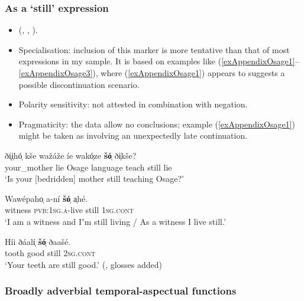\subsubsection{As a \lq{}still\rq{ }expression}
\begin{itemize}
	\item \citeauthor{Quintero1997} (\citeyear[305]{Quintero1997}, \citeyear[307–308, 410, 446]{Quintero2004}, \citeyear[208]{QuinteroDictionary}).
	\item Specialisation: inclusion of this marker is more tentative than that of most expressions in my sample. It is  based on examples like (\ref{exAppendixOsage1}–\ref{exAppendixOsage3}), where (\ref{exAppendixOsage1}) appears to suggests a possible discontinuation scenario.
	\item Polarity sensitivity: not attested in combination with negation.
	\item Pragmaticity: the data allow no conclusions; example (\ref{exAppendixOsage1}) might be taken as involving an unexpectedly late continuation.
\end{itemize}

\begin{exe}
	\ex\label{exAppendixOsage1}
	\gll ði̜̜i̜hó̜ kše wažáže íe wakó̜ze \textbf{šó̜} ði̜kše?\\
	your\_mother lie Osage language teach still lie\\
	\glt \lq Is your [bedridden] mother still teaching Osage?' \parencite[357]{Quintero2004}

	\ex\label{exAppendixOsage2}
	\gll Wawépaho̜ a-ní \textbf{šó̜} a̜hé.\\
	witness \textsc{pvb}:1\textsc{sg}.\textsc{a}-live still 1\textsc{sg}.\textsc{cont}\\
\glt \lq I am a witness and Iʼm still living / As a witness I live still.\rq{ }\parencite[410]{Quintero2004}

	\ex\label{exAppendixOsage3}
	\gll Híi ðáalí̜ \textbf{šó̜} ðaašé.\\
	tooth good still 2\textsc{sg}.\textsc{cont}\\
	\glt \lq Your teeth are still good.' (\cite[208]{QuinteroDictionary}, glosses added)
\end{exe}

\subsubsection{Broadly adverbial temporal-aspectual functions}
